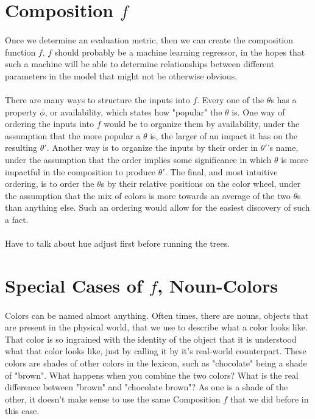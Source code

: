 \documentclass[12pt, letterpaper]{article}
\begin{document}
\section{Composition $f$}

\paragraph{} Once we determine an evaluation metric, then we can create the composition function $f$. $f$ should probably be a machine learning regressor, in the hopes that such a machine will be able to determine relationships between different parameters in the model that might not be otherwise obvious.

\paragraph{} There are many ways to structure the inputs into $f$. Every one of the $\theta$s has a property $\phi$, or availability, which states how "popular" the $\theta$ is. One way of ordering the inputs into $f$ would be to organize them by availability, under the assumption that the more popular a $\theta$ is, the larger of an impact it has on the resulting $\theta'$. Another way is to organize the inputs by their order in $\theta'$'s name, under the assumption that the order implies some significance in which $\theta$ is more impactful in the composition to produce $\theta'$. The final, and most intuitive  ordering, is to order the $\theta$s by their relative positions on the color wheel, under the assumption that the mix of colors is more towards an average of the two $\theta$s than anything else. Such an ordering would allow for the easiest discovery of such a fact.

\paragraph{} Have to talk about hue adjust first before running the trees.

\section{Special Cases of $f$, Noun-Colors}

\paragraph{} Colors can be named almost anything. Often times, there are nouns, objects that are present in the physical world, that we use to describe what a color looks like. That color is so ingrained with the identity of the object that it is understood what that color looks like, just by calling it by it's real-world counterpart. These colors are shades of other colors in the lexicon, such as "chocolate" being a shade of "brown". What happens when you combine the two colors? What is the real difference between "brown" and "chocolate brown"? As one is a shade of the other, it doesn't make sense to use the same Composition $f$ that we did before in this case.
\end{document}

